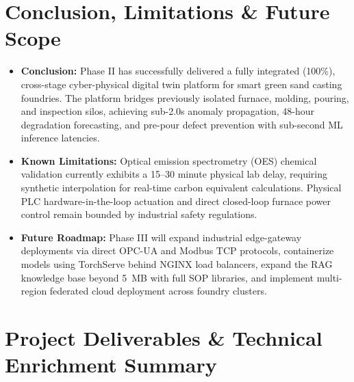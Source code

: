 \documentclass[11pt, a4paper]{article}
\begin{document}
\section{Conclusion, Limitations \& Future Scope}
\begin{itemize}[noitemsep, topsep=2pt]
    \item \textbf{Conclusion:} Phase II has successfully delivered a fully integrated (100\%), cross-stage cyber-physical digital twin platform for smart green sand casting foundries. The platform bridges previously isolated furnace, molding, pouring, and inspection silos, achieving sub-2.0s anomaly propagation, 48-hour degradation forecasting, and pre-pour defect prevention with sub-second ML inference latencies.
    \item \textbf{Known Limitations:} Optical emission spectrometry (OES) chemical validation currently exhibits a 15--30 minute physical lab delay, requiring synthetic interpolation for real-time carbon equivalent calculations. Physical PLC hardware-in-the-loop actuation and direct closed-loop furnace power control remain bounded by industrial safety regulations.
    \item \textbf{Future Roadmap:} Phase III will expand industrial edge-gateway deployments via direct OPC-UA and Modbus TCP protocols, containerize models using TorchServe behind NGINX load balancers, expand the RAG knowledge base beyond 5~MB with full SOP libraries, and implement multi-region federated cloud deployment across foundry clusters.
\end{itemize}

\section{Project Deliverables \& Technical Enrichment Summary}
\end{document}
